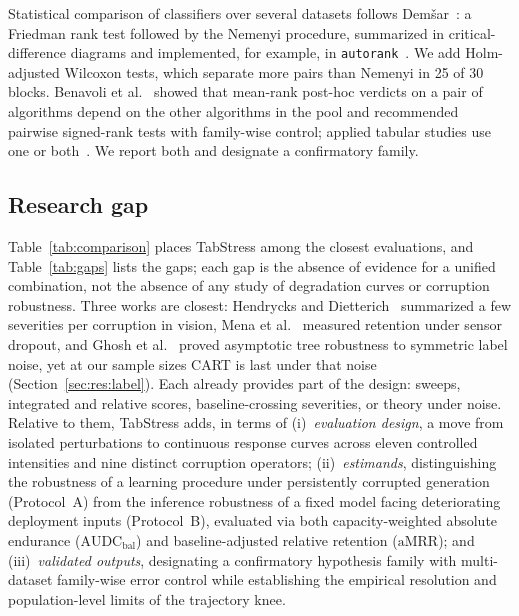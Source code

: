 \documentclass[pdflatex,sn-mathphys]{sn-jnl}
\theoremstyle{thmstyleone}
\theoremstyle{thmstyletwo}
\theoremstyle{thmstylethree}
\newcommand{\AUDC}{\mathrm{AUDC}}
\newcommand{\aMRR}{\mathrm{aMRR}}
\begin{document}
Statistical comparison of classifiers over several datasets follows Dem\v{s}ar~\cite{demsar2006statistical}: a Friedman rank test followed by the Nemenyi procedure, summarized in critical-difference diagrams and implemented, for example, in \texttt{autorank}~\cite{herbold2020autorank}. We add Holm-adjusted Wilcoxon tests, which separate more pairs than Nemenyi in 25 of 30 blocks. Benavoli et al.~\cite{benavoli2016should} showed that mean-rank post-hoc verdicts on a pair of algorithms depend on the other algorithms in the pool and recommended pairwise signed-rank tests with family-wise control; applied tabular studies use one or both~\cite{perezlebel2022benchmarking,borisov2024deep}. We report both and designate a confirmatory family.

\subsection{Research gap}\label{sec:related:gap}

Table~\ref{tab:comparison} places TabStress among the closest evaluations, and Table~\ref{tab:gaps} lists the gaps; each gap is the absence of evidence for a unified combination, not the absence of any study of degradation curves or corruption robustness. Three works are closest: Hendrycks and Dietterich~\cite{hendrycks2019benchmarking} summarized a few severities per corruption in vision, Mena et al.~\cite{mena2025multisensor} measured retention under sensor dropout, and Ghosh et al.~\cite{ghosh2017robustness} proved asymptotic tree robustness to symmetric label noise, yet at our sample sizes CART is last under that noise (Section~\ref{sec:res:label}). Each already provides part of the design: sweeps, integrated and relative scores, baseline-crossing severities, or theory under noise. Relative to them, TabStress adds, in terms of
(i)~\emph{evaluation design}, a move from isolated perturbations to continuous response curves across eleven controlled intensities and nine distinct corruption operators;
(ii)~\emph{estimands}, distinguishing the robustness of a learning procedure under persistently corrupted generation (Protocol~A) from the inference robustness of a fixed model facing deteriorating deployment inputs (Protocol~B), evaluated via both capacity-weighted absolute endurance ($\AUDC_{\mathrm{bal}}$) and baseline-adjusted relative retention ($\aMRR$); and
(iii)~\emph{validated outputs}, designating a confirmatory hypothesis family with multi-dataset family-wise error control while establishing the empirical resolution and population-level limits of the trajectory knee.
\end{document}
